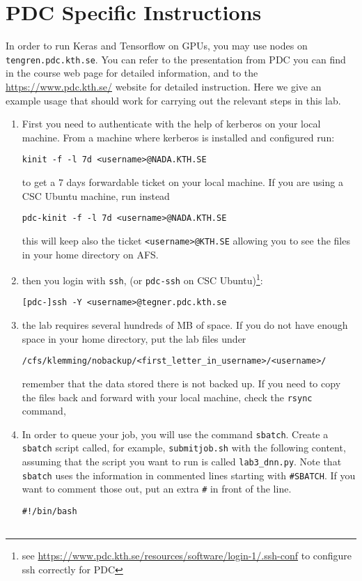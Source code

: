 \documentclass{nada-ten}
\begin{document}
\clearpage
\appendix

\clearpage
\section{PDC Specific Instructions}
\label{app:pdc}
In order to run Keras and Tensorflow on GPUs, you may use nodes on \texttt{tengren.pdc.kth.se}. You can refer to the presentation from PDC you can find in the course web page for detailed information, and to the \url{https://www.pdc.kth.se/} website for detailed instruction. Here we give an example usage that should work for carrying out the relevant steps in this lab.

\begin{enumerate}
\item First you need to authenticate with the help of kerberos on your local machine. From a machine where kerberos is installed and configured run:
\begin{verbatim}
kinit -f -l 7d <username>@NADA.KTH.SE
\end{verbatim}
to get a 7 days forwardable ticket on your local machine. If you are using a CSC Ubuntu machine, run instead 
\begin{verbatim}
pdc-kinit -f -l 7d <username>@NADA.KTH.SE
\end{verbatim}
this will keep also the ticket \verb|<username>@KTH.SE| allowing you to see the files in your home directory on AFS.
\item then you login with \texttt{ssh}, (or \texttt{pdc-ssh} on CSC Ubuntu)\footnote{see \url{https://www.pdc.kth.se/resources/software/login-1/.ssh-conf} to configure ssh correctly for PDC}:
\begin{verbatim}
[pdc-]ssh -Y <username>@tegner.pdc.kth.se
\end{verbatim}
\item the lab requires several hundreds of MB of space. If you do not have enough space in your home directory, put the lab files under
\begin{verbatim}
/cfs/klemming/nobackup/<first_letter_in_username>/<username>/
\end{verbatim}
remember that the data stored there is not backed up. If you need to copy the files back and forward with your local machine, check the \texttt{rsync} command,
\item In order to queue your job, you will use the command \texttt{sbatch}. Create a \texttt{sbatch} script called, for example, \texttt{submitjob.sh} with the following content, assuming that the script you want to run is called \texttt{lab3\_dnn.py}. Note that \texttt{sbatch} uses the information in commented lines starting with \texttt{\#SBATCH}. If you want to comment those out, put an extra \texttt{\#} in front of the line.
\begin{verbatim}
#!/bin/bash 


\end{verbatim}
\end{enumerate}
\end{document}
